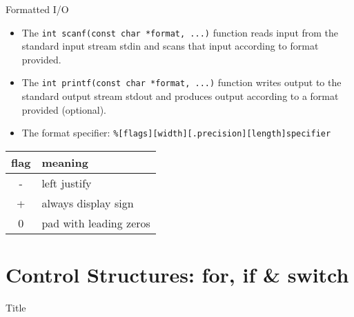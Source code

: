 \documentclass[10pt,t]{beamer}
\begin{document}
\begin{frame}[fragile]{Formatted I/O}
  \begin{itemize}
    \item The \lstinline|int scanf(const char *format, ...)| function reads input from the standard input stream stdin and scans that input according to format provided.
    \item The \lstinline|int printf(const char *format, ...)| function writes output to the standard output stream stdout and produces output according to a format provided (optional).
      
    \item The format specifier: \lstinline|%[flags][width][.precision][length]specifier| 
  \end{itemize}
  \begin{center}
    \begin{tabular}{cl}
      \hline
      flag & meaning \\
      \hline
      - & left justify \\
      + & always display sign\\
      0 & pad with leading zeros\\
      \hline
    \end{tabular}
  \end{center}
\end{frame}

\section{Control Structures: for, if \& switch}
\begin{frame}{Title}

\end{frame}
\end{document}
